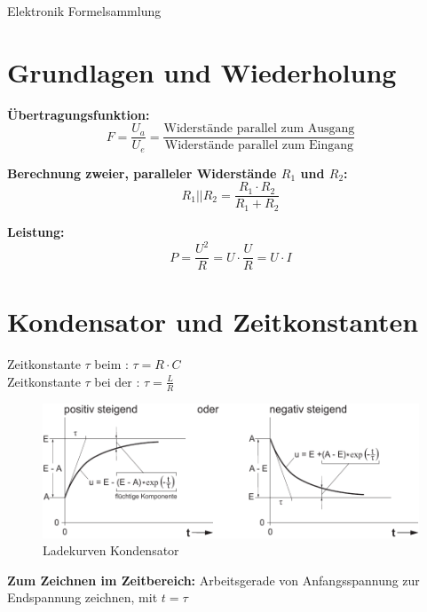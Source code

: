 \documentclass[a5paper, 12pt]{scrartcl}
\begin{document}
\begin{center}
  \huge Elektronik Formelsammlung
\end{center}

\section{Grundlagen und Wiederholung}

\begin{minipage}{.45\textwidth}
\textbf{Übertragungsfunktion:} \[F = \frac{U_a}{U_e} = \frac{\text{Widerstände parallel zum Ausgang}}{\text{Widerstände parallel zum Eingang}}\]

\textbf{Berechnung zweier, paralleler Widerstände \(R_1\) und \(R_2\):} \[R_1 || R_2 = \frac{R_1 \cdot R_2}{R_1 + R_2}\]

\textbf{Leistung:} \[P = \frac{U^2}{R} = U \cdot \frac{U}{R} = U \cdot I\]
\end{minipage}\hfill\vline\hfill%
\begin{minipage}{.45\textwidth}
  \lipsum[4]
\end{minipage}

\section{Kondensator und Zeitkonstanten}

Zeitkonstante \(\tau\) beim : \dotfill \(\tau = R \cdot C\)\\
Zeitkonstante \(\tau\) bei der : \dotfill \(\tau = \frac{L}{R}\)\\

\begin{figure}[H]
  \centering
  \includegraphics[width=.7\textwidth]{LadekurveKondensator}
  \caption{Ladekurven Kondensator }
\end{figure}

\textbf{Zum Zeichnen im Zeitbereich:} Arbeitsgerade von Anfangsspannung zur Endspannung zeichnen, mit \(t = \tau\)
\end{document}
